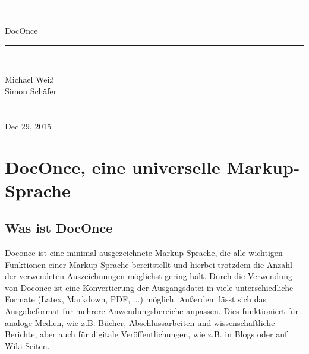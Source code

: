 \documentclass[%
oneside,                 %
final,                   %
chapterprefix=true,      %
open=right,              %
10pt]{book}
\begin{document}






\thispagestyle{empty}
\hbox{\ \ }
\vfill
\begin{center}
{\huge{\bfseries{
\begin{spacing}{1.25}
{\rule{\linewidth}{0.5mm}} \\[0.4cm]
{DocOnce}
\\[0.4cm] {\rule{\linewidth}{0.5mm}} \\[1.5cm]
\end{spacing}
}}}


\vspace{0.5cm}

{\Large\textsf{Michael Weiß${}^{}$}}\\ [3mm]

{\Large\textsf{Simon Schäfer${}^{}$}}\\ [3mm]

\ \\ [2mm]


\ \\ [10mm]
{\large\textsf{Dec 29, 2015}}

\end{center}
\vfill
\clearpage

\tableofcontents


\vspace{1cm} %




\chapter{DocOnce, eine universelle Markup-Sprache}
\section{Was ist DocOnce}
Doconce ist eine minimal ausgezeichnete Markup-Sprache, die alle wichtigen Funktionen einer Markup-Sprache bereitstellt und hierbei trotzdem die Anzahl der verwendeten Auszeichnungen möglichst gering hält. Durch die Verwendung von Doconce ist eine Konvertierung der Ausgangsdatei in viele unterschiedliche Formate (Latex, Markdown, PDF, ...) möglich. Außerdem lässt sich das Ausgabeformat für mehrere Anwendungsbereiche anpassen. Dies funktioniert für analoge Medien, wie z.B. Bücher, Abschlussarbeiten und wissenschaftliche Berichte, aber auch für digitale Veröffentlichungen, wie z.B. in Blogs oder auf Wiki-Seiten.
\end{document}
